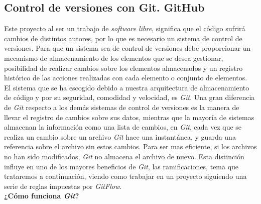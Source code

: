 \subsection{Control de versiones con Git. GitHub}
\label{subsec:git}
\begin{figure}[h]
    \centering
     \hspace{30mm}
\end{figure}
Este proyecto al ser un trabajo de \emph{software libre}, significa que el código sufrirá cambios de distintos autores, por lo que es necesario un sistema de control de versiones. Para que un sistema sea de control de versiones debe proporcionar un mecanismo de almacenamiento de los elementos que se desea gestionar, posibilidad de realizar cambios sobre los elementos almacenados y un registro histórico de las acciones realizadas con cada elemento o conjunto de elementos. \\
El sistema que se ha escogido debido a nuestra arquitectura de almacenamiento de código y por su seguridad, comodidad y velocidad, es \emph{Git}. Una gran diferencia de \emph{Git} respecto a los demás sistemas de control de versiones es la manera de llevar el registro de cambios sobre sus datos, mientras que la mayoría de sistemas almacenan la información como una lista de cambios, en \emph{Git}, cada vez que se realiza un cambio sobre un archivo \emph{Git} hace una instantánea, y guarda una referencia sobre el archivo sin estos cambios. Para ser mas eficiente, si los archivos no han sido modificados, \emph{Git} no almacena el archivo de nuevo. Esta distinción influye en uno de los mayores beneficios de \emph{Git}, las ramificaciones, tema que trataremos a continuación, viendo como trabajar en un proyecto siguiendo una serie de reglas impuestas por \emph{GitFlow}. \\
\textbf{¿Cómo funciona \emph{Git}?}\\
